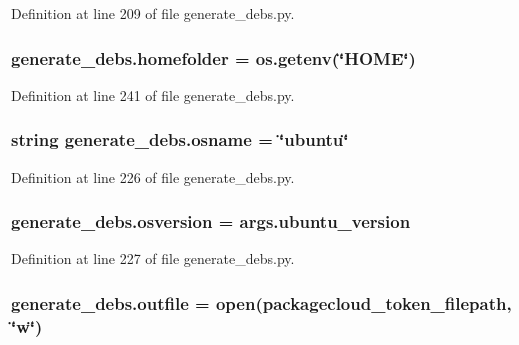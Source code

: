 Definition at line 209 of file generate\+\_\+debs.\+py.

\subsubsection[{\texorpdfstring{homefolder}{homefolder}}]{\setlength{\rightskip}{0pt plus 5cm}generate\+\_\+debs.\+homefolder = os.\+getenv(\char`\"{}H\+O\+ME\char`\"{})}\hypertarget{namespacegenerate__debs_aeb83979be2939a8059435a906a91f682}{}\label{namespacegenerate__debs_aeb83979be2939a8059435a906a91f682}


Definition at line 241 of file generate\+\_\+debs.\+py.

\subsubsection[{\texorpdfstring{osname}{osname}}]{\setlength{\rightskip}{0pt plus 5cm}string generate\+\_\+debs.\+osname = \char`\"{}ubuntu\char`\"{}}\hypertarget{namespacegenerate__debs_ad06322332de29cb27a40152d0cccc2ca}{}\label{namespacegenerate__debs_ad06322332de29cb27a40152d0cccc2ca}


Definition at line 226 of file generate\+\_\+debs.\+py.

\subsubsection[{\texorpdfstring{osversion}{osversion}}]{\setlength{\rightskip}{0pt plus 5cm}generate\+\_\+debs.\+osversion = args.\+ubuntu\+\_\+version}\hypertarget{namespacegenerate__debs_afd02fe6ead63bc5db5d3c3b9eb973b62}{}\label{namespacegenerate__debs_afd02fe6ead63bc5db5d3c3b9eb973b62}


Definition at line 227 of file generate\+\_\+debs.\+py.

\subsubsection[{\texorpdfstring{outfile}{outfile}}]{\setlength{\rightskip}{0pt plus 5cm}generate\+\_\+debs.\+outfile = open({\bf packagecloud\+\_\+token\+\_\+filepath}, \char`\"{}w\char`\"{})}\hypertarget{namespacegenerate__debs_aa1faa039b35b72ee44dc6f106ad12911}{}\label{namespacegenerate__debs_aa1faa039b35b72ee44dc6f106ad12911}


